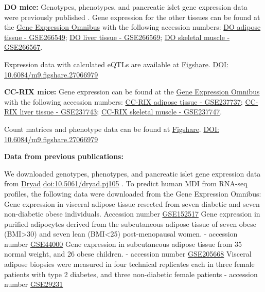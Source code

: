 \documentclass[
]{article}
\begin{document}
\textbf{DO mice:} Genotypes, phenotypes, and pancreatic islet gene
expression data were previously published \cite{pmid29567659}. Gene
expression for the other tissues can be found at the
\href{https://www.ncbi.nlm.nih.gov/geo/}{Gene Expression Omnibus} with
the following accession numbers:
\href{https://www.ncbi.nlm.nih.gov/geo/query/acc.cgi?acc=GSE266549}{DO
adipose tissue - GSE266549};
\href{https://www.ncbi.nlm.nih.gov/geo/query/acc.cgi?acc=GSE266569}{DO
liver tissue - GSE266569};
\href{https://www.ncbi.nlm.nih.gov/geo/query/acc.cgi?acc=GSE266567}{DO
skeletal muscle - GSE266567}.

Expression data with calculated eQTLs are available at
\href{https://figshare.com/}{Figshare}.
\href{https://figshare.com/articles/dataset/Data_and_code_for_High-Dimensional_Mediation_Analysis_HDMA_in_diversity_outbred_mice/27066979}{DOI:
10.6084/m9.figshare.27066979} \cite{cube_data}

\textbf{CC-RIX mice:} Gene expression can be found at the
\href{https://www.ncbi.nlm.nih.gov/geo/}{Gene Expression Omnibus} with
the following accession numbers:
\href{https://www.ncbi.nlm.nih.gov/geo/query/acc.cgi?acc=GSE237737}{CC-RIX
adipose tissue - GSE237737};
\href{https://www.ncbi.nlm.nih.gov/geo/query/acc.cgi?acc=GSE237743}{CC-RIX
liver tissue - GSE237743};
\href{https://www.ncbi.nlm.nih.gov/geo/query/acc.cgi?acc=GSE237747}{CC-RIX
skeletal muscle - GSE237747}.

Count matrices and phenotype data can be found at
\href{https://figshare.com/}{Figshare}.
\href{https://figshare.com/articles/dataset/Data_and_code_for_High-Dimensional_Mediation_Analysis_HDMA_in_diversity_outbred_mice/27066979}{DOI:
10.6084/m9.figshare.27066979} \cite{cube_data}

\textbf{Data from previous publications:}

We downloaded genotypes, phenotypes, and pancreatic islet gene
expression data from \href{https://datadryad.org/}{Dryad}
\href{https://datadryad.org/dataset/doi:10.5061/dryad.pj105}{doi:10.5061/dryad.pj105}
\cite{DO_data}. To predict human MDI from RNA-seq profiles, the
following data were downloaded from the Gene Expression Omnibus: Gene
expression in visceral adipose tissue resected from seven diabetic and
seven non-diabetic obese individuals. Accession number
\href{https://www.ncbi.nlm.nih.gov/geo/query/acc.cgi?acc=GSE152517}{GSE152517}
Gene expression in purified adipocytes derived from the subcutaneous
adipose tissue of seven obese (BMI\textgreater30) and seven lean
(BMI\textless25) post-menopausal women. - accession number
\href{https://www.ncbi.nlm.nih.gov/geo/query/acc.cgi?acc=GSE44000}{GSE44000}
Gene expression in subcutaneous adipose tissue from 35 normal weight,
and 26 obese children. - accession number
\href{https://www.ncbi.nlm.nih.gov/geo/query/acc.cgi?acc=GSE205668}{GSE205668}
Visceral adipose biopsies were measured in four technical replicates
each in three female patients with type 2 diabetes, and three
non-diabetic female patients - accession number
\href{https://www.ncbi.nlm.nih.gov/geo/query/acc.cgi?acc=GSE29231}{GSE29231}
\end{document}

